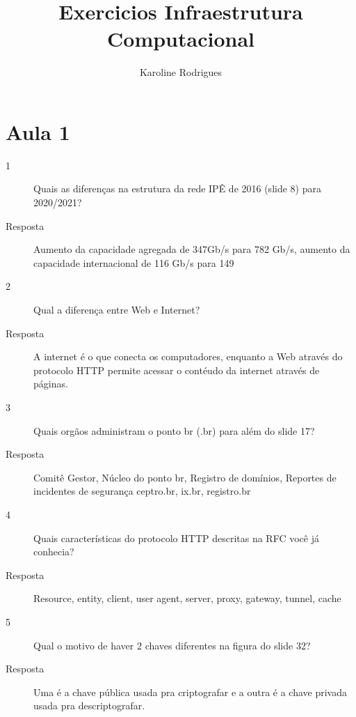 \documentclass[12pt]{article}
\title{Exercicios Infraestrutura Computacional }
\author{Karoline Rodrigues}
\begin{document}
\normalsize
\maketitle
\section{Aula 1}
\label{sec:Aula1}
\begin{description}
    \item[1] Quais as diferenças na estrutura da rede IPÊ de 2016 (slide 8) para 2020/2021?
    \item[Resposta] Aumento da capacidade agregada de 347Gb/s para 782 Gb/s, aumento da capacidade internacional de 116 Gb/s para 149 
    \item[2] Qual a diferença entre Web e Internet?
    \item[Resposta] A internet é o que conecta os computadores, enquanto a Web através do protocolo HTTP permite acessar o contéudo da internet através de páginas.
    \item[3] Quais orgãos administram o ponto br (.br) para além do slide 17?
    \item[Resposta] Comitê Gestor, Núcleo do ponto br, Registro de domínios, Reportes de incidentes de segurança
     ceptro.br, ix.br, registro.br
    \item[4] Quais características do protocolo HTTP descritas na RFC você já conhecia?
    \item[Resposta] Resource, entity, client, user agent, server, proxy, gateway, tunnel, cache
    \item[5] Qual o motivo de haver 2 chaves diferentes na figura do slide 32?
    \item[Resposta]Uma é a chave pública usada pra criptografar e a outra é a chave privada usada pra descriptografar.
\end{description}
\end{document}
